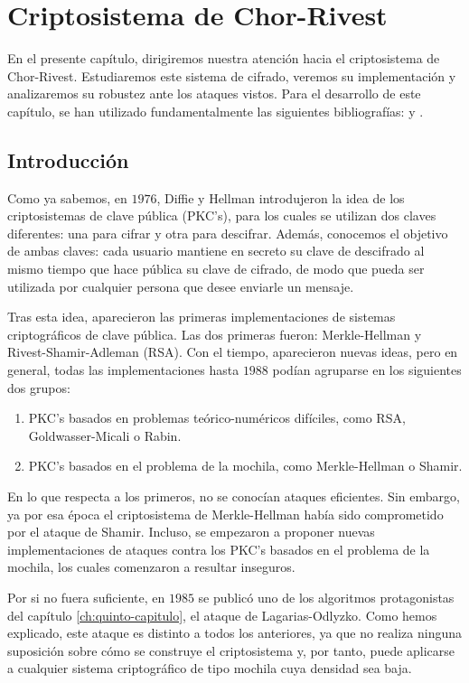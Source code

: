 \chapter{Criptosistema de Chor-Rivest} \label{ch:sexto-capitulo}
    
    En el presente capítulo, dirigiremos nuestra atención hacia el criptosistema de Chor-Rivest. Estudiaremos este sistema de cifrado, veremos su implementación y analizaremos su robustez ante los ataques vistos. Para el desarrollo de este capítulo, se han utilizado fundamentalmente las siguientes bibliografías: \cite{artChorRivest} y \cite{artQuanChorRivest}.
    
    \section{Introducción}
    
    Como ya sabemos, en $1976$, Diffie y Hellman introdujeron la idea de los criptosistemas de clave pública (PKC's), para los cuales se utilizan dos claves diferentes: una para cifrar y otra para descifrar. Además, conocemos el objetivo de ambas claves: cada usuario mantiene en secreto su clave de descifrado al mismo tiempo que hace pública su clave de cifrado, de modo que pueda ser utilizada por cualquier persona que desee enviarle un mensaje.
    
    Tras esta idea, aparecieron las primeras implementaciones de sistemas criptográficos de clave pública. Las dos primeras fueron: Merkle-Hellman y Rivest-Shamir-Adleman (RSA). Con el tiempo, aparecieron nuevas ideas, pero en general, todas las implementaciones hasta $1988$ podían agruparse en los siguientes dos grupos:
    \begin{enumerate}
        \item PKC's basados en problemas teórico-numéricos difíciles, como RSA, Goldwasser-Micali o Rabin.
        \item PKC's basados en el problema de la mochila, como Merkle-Hellman o Shamir.
    \end{enumerate}
    En lo que respecta a los primeros, no se conocían ataques eficientes. Sin embargo, ya por esa época el criptosistema de Merkle-Hellman había sido comprometido por el ataque de Shamir. Incluso, se empezaron a proponer nuevas implementaciones de ataques contra los PKC's basados en el problema de la mochila, los cuales comenzaron a resultar inseguros.
    
    Por si no fuera suficiente, en $1985$ se publicó uno de los algoritmos protagonistas del capítulo \ref{ch:quinto-capitulo}, el ataque de Lagarias-Odlyzko. Como hemos explicado, este ataque es distinto a todos los anteriores, ya que no realiza ninguna suposición sobre cómo se construye el criptosistema y, por tanto, puede aplicarse a cualquier sistema criptográfico de tipo mochila cuya densidad sea baja.
    
